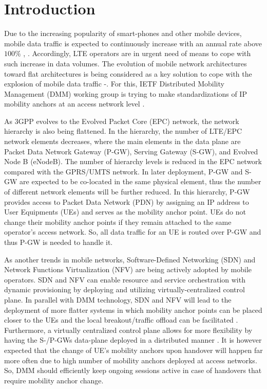 \documentclass[runningheads,a4paper]{llncs}
\begin{document}
\section{Introduction}

Due to the increasing popularity of smart-phones and other mobile devices, mobile data traffic is expected to continuously increase with an annual rate above $100\%$ \cite{ref1}, \cite{ref2}. Accordingly, LTE operators are in urgent need of means to cope with such increase in data volumes. The evolution of mobile network architectures toward flat architectures is being considered as a key solution to cope with the explosion of mobile data traffic \cite{ref3}-\cite{ref5}. For this, IETF Distributed Mobility Management (DMM) working group is trying to make standardizations of IP mobility anchors at an access network level \cite{ref6,ref7}. 

As 3GPP evolves to the Evolved Packet Core (EPC) network, the network hierarchy is also being flattened. In the hierarchy, the number of LTE/EPC network elements decreases, where the main elements in the data plane are Packet Data Network Gateway (P-GW), Serving Gateway (S-GW), and Evolved Node B (eNodeB). The number of hierarchy levels is reduced in the EPC network compared with the GPRS/UMTS network. In later deployment, P-GW and S-GW are expected to be co-located in the same physical element, thus the number of different network elements will be further reduced. In this hierarchy, P-GW provides access to Packet Data Network (PDN) by assigning an IP address to User Equipments (UEs) and serves as the mobility anchor point. UEs do not change their mobility anchor points if they remain attached to the same operator's access network. So, all data traffic for an UE is routed over P-GW and thus P-GW is needed to handle it.

As another trends in mobile networks, Software-Defined Networking (SDN) and Network Functions Virtualization (NFV) are being actively adopted by mobile operators. SDN and NFV can enable resource and service orchestration with dynamic provisioning by deploying and utilizing virtually-centralized control plane. In parallel with DMM technology, SDN and NFV will lead to the deployment of more flatter systems in which mobility anchor points can be placed closer to the UEs and the local breakout/traffic offload can be facilitated \cite{ref8}. Furthermore, a virtually centralized control plane allows for more flexibility by having the S-/P-GWs data-plane deployed in a distributed manner \cite{ref8-1}. It is however expected that the change of UE's mobility anchors upon handover will happen far more often due to high number of mobility anchors deployed at access networks. So, DMM should efficiently keep ongoing sessions active in case of handovers that require mobility anchor change. 
\end{document}
